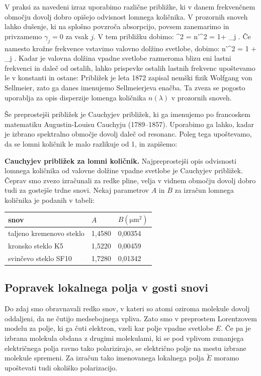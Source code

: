 V praksi za navedeni izraz uporabimo različne približke, ki v danem frekvenčnem
območju dovolj dobro opišejo odvisnost lomnega količnika. V prozornih snoveh lahko 
dušenje, ki na splošno povzroča absorpcijo, povsem zanemarimo in privzamemo $\gamma_j = 0$ za 
vsak $j$. V tem približku dobimo:
\beq
{}^2 = n'^2 = 1+ \sum_j .
\label{eq:09_28}
\eeq
Če namesto krožne frekvence vstavimo valovno dolžino svetlobe, dobimo:
\beq
n'^2 = 1 + \sum_j .
\label{eq:09_29}
\eeq
Kadar je valovna dolžina vpadne svetlobe razmeroma blizu eni lastni frekvenci in daleč
od ostalih, lahko prispevke ostalih lastnih frekvenc upoštevamo le v konstanti in ostane:
Približek je leta 1872 zapisal nemški fizik Wolfgang von Sellmeier, zato ga danes
imenujemo Sellmeierjeva enačba. Ta zveza se pogosto uporablja za opis disperzije 
lomenga količnika $n(\lambda)$ v prozornih snoveh. 

Še preprostejši približek je Cauchyjev približek, ki ga imenujemo po francoskem matematiku
Augustin-Louisu Cauchyju (1789--1857). Uporabimo ga lahko, kadar je izbrano spektralno
območje dovolj daleč od resonanc. Poleg tega upoštevamo, da se lomni količnik le malo 
razlikuje od 1, in zapišemo:

\begin{example}{\bf Cauchyjev približek za lomni količnik.}
Najpreprostejši opis odvisnosti lomnega količnika od valovne dolžine vpadne svetlobe
je Cauchyjev približek. Čeprav smo zvezo izračunali za redke pline, velja v vidnem
območju dovolj dobro tudi
za gostejše trdne snovi. Nekaj parametrov $A$ in $B$ za izračun lomnega količnika
je podanih v tabeli:
\begin{center}
\begin{tabular}{|l|l|l|}
\hline
snov& $A$ & $B (\si{\micro\metre}^2)$\\ \hline 
taljeno kremenovo steklo & 1,4580 & 0,00354\\ \hline
kronsko steklo K5 & 1,5220 & 0,00459\\ \hline
svinčevo steklo SF10 & 1,7280 & 0,01342\\ \hline
\end{tabular}
\end{center}
\end{example}

\subsection*{Popravek lokalnega polja v gosti snovi}
Do zdaj smo obravnavali redko snov, v kateri so atomi oziroma molekule
dovolj oddaljeni, da ne čutijo medsebojnega vpliva. 
Zato smo v preprostem Lorentzovem modelu za polje, ki ga čuti elektron, 
vzeli kar polje vpadne svetlobe $E$. Če pa je izbrana molekula obdana
z drugimi molekulami, ki se pod vplivom zunanjega električnega polja 
ravno tako polarizirajo, se  električno polje na mestu izbrane 
molekule spremeni. Za izračun tako imenovanega lokalnega polja $\tilde{E}$
moramo upoštevati tudi okoliško polarizacijo.


